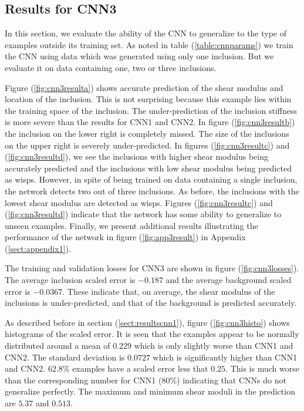 \documentclass[10pt]{article}
\begin{document}
\subsection{\label{sect:resultscnn3}Results for CNN3}
In this section, we evaluate the ability of the CNN to generalize to the type of examples outside its training set. As noted in table (\ref{table:cnnparams}) we train the CNN using data which was generated using only one inclusion. But we evaluate it on data containing one, two or three inclusions.

Figure (\ref{fig:cnn3resulta}) shows accurate prediction of the shear modulus and location of the inclusion. This is not surprising because this example lies within the training space of the inclusion. The under-prediction of the inclusion stiffness is more severe than the results for CNN1 and CNN2. In figure (\ref{fig:cnn3resultb}) the inclusion on the lower right is completely missed. The size of the inclusions on the upper right is severely under-predicted. In figures (\ref{fig:cnn3resultc}) and (\ref{fig:cnn3resultd}), we see the inclusions with higher shear modulus being accurately predicted and the inclusions with low shear modulus being predicted as wisps. However, in spite of being trained on data containing a single inclusion, the network detects two out of three inclusions. As before, the inclusions with the lowest shear modulus are detected as wisps. Figures (\ref{fig:cnn3resultc}) and (\ref{fig:cnn3resultd}) indicate that the network has some ability to generalize to unseen examples. Finally, we present additional results illustrating the performance of the network in figure (\ref{fig:app3result}) in Appendix (\ref{sect:appendix1}).

The training and validation losses for CNN3 are shown in figure (\ref{fig:cnn3losses}). The average inclusion scaled error is $-0.187$ and the average background scaled error is $-0.0367$. These indicate that, on average, the shear modulus of the inclusions is under-predicted, and that of the background is predicted accurately.

As described before in section (\ref{sect:resultscnn1}), figure (\ref{fig:cnn3histo}) shows histograms of the scaled error. It is seen that the examples appear to be normally distributed around a mean of ${0.229}$ which is only slightly worse than CNN1 and CNN2. The standard deviation is $0.0727$ which is significantly higher than CNN1 and CNN2. $62.8\%$ examples have a scaled error less that $0.25$. This is much worse than the corresponding number for CNN1 ($80\%$) indicating that CNNs do not generalize perfectly. The maximum and minimum shear moduli in the prediction are $5.37$ and $0.513$.
\end{document}
